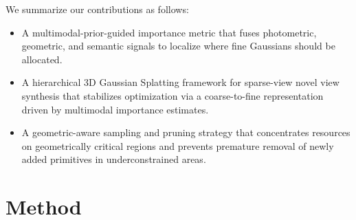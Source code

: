 \documentclass{article}
\begin{document}
  We summarize our contributions as follows:
  \begin{itemize}
    \setlength{\itemsep}{2pt}
    \setlength{\parsep}{0pt}
    \setlength{\parskip}{0pt}
  
  \item A multimodal-prior-guided importance metric that fuses photometric, geometric, and semantic signals to localize where fine Gaussians should be allocated.
  \item  A hierarchical 3D Gaussian Splatting framework for sparse-view novel view synthesis that stabilizes optimization via a coarse-to-fine representation driven by multimodal importance estimates.
  \item  A geometric-aware sampling and pruning strategy that concentrates resources on geometrically critical regions and prevents premature removal of newly added primitives in underconstrained areas.
  \end{itemize}
  
  \section{Method}
  \label{sec:method}
  
  
  
  
\end{document}
